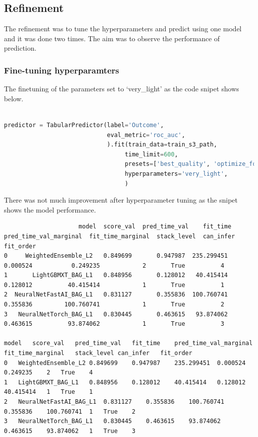\documentclass[
]{article}
\begin{document}
\hypertarget{refinement}{%
\subsection{Refinement}\label{refinement}}

The refinement was to tune the hyperparameters and predict using one
model and it was done two times. The aim was to observe the performance
of prediction.

\hypertarget{fine-tuning-hyperparamters}{%
\subsubsection{Fine-tuning
hyperparamters}\label{fine-tuning-hyperparamters}}

The finetuning of the parameters set to `very\_light' as the code snipet
shows below.

\begin{lstlisting}[language=python]
%%time

predictor = TabularPredictor(label='Outcome', 
                             eval_metric='roc_auc',
                             ).fit(train_data=train_s3_path,
                                  time_limit=600,
                                  presets=['best_quality', 'optimize_for_deployment'],
                                  hyperparameters='very_light',
                                  )
\end{lstlisting}

There was not much improvement after hyperparameter tuning as the snipet
shows the model performance.

\begin{verbatim}
                     model  score_val  pred_time_val    fit_time  pred_time_val_marginal  fit_time_marginal  stack_level  can_infer  fit_order
0     WeightedEnsemble_L2   0.849699       0.947987  235.299451                0.000524           0.249235            2       True          4
1       LightGBMXT_BAG_L1   0.848956       0.128012   40.415414                0.128012          40.415414            1       True          1
2  NeuralNetFastAI_BAG_L1   0.831127       0.355836  100.760741                0.355836         100.760741            1       True          2
3   NeuralNetTorch_BAG_L1   0.830445       0.463615   93.874062                0.463615          93.874062            1       True          3

model   score_val   pred_time_val   fit_time    pred_time_val_marginal  fit_time_marginal   stack_level can_infer   fit_order
0   WeightedEnsemble_L2 0.849699    0.947987    235.299451  0.000524    0.249235    2   True    4
1   LightGBMXT_BAG_L1   0.848956    0.128012    40.415414   0.128012    40.415414   1   True    1
2   NeuralNetFastAI_BAG_L1  0.831127    0.355836    100.760741  0.355836    100.760741  1   True    2
3   NeuralNetTorch_BAG_L1   0.830445    0.463615    93.874062   0.463615    93.874062   1   True    3
\end{verbatim}
\end{document}
